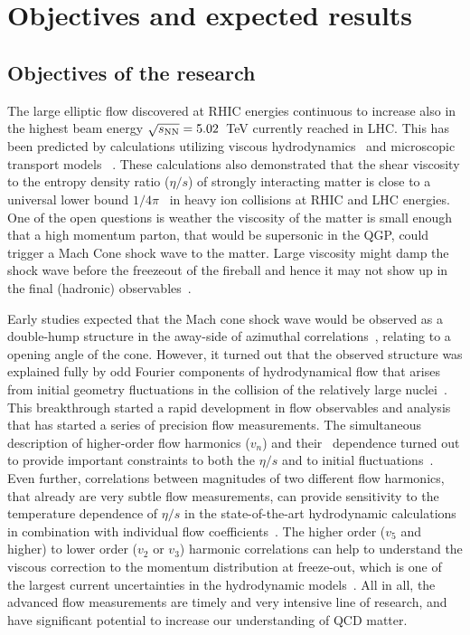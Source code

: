 \section{Objectives and expected results} %
\label{sec:objectives}

\subsection{Objectives of the research}

The large elliptic flow discovered at RHIC energies continuous to increase also in the highest beam energy $\sqrt{s_{\rm NN}}=5.02$~TeV currently reached in LHC. This has been predicted by calculations utilizing viscous hydrodynamics~\cite{PhysRevLett.99.172301} and microscopic transport models ~\cite{PhysRevLett.101.082302}.  These calculations also demonstrated that the shear viscosity to the entropy density ratio ($\eta/s$) of strongly interacting matter is close to a universal lower bound $1/4\pi$~\cite{PhysRevLett.94.111601} in heavy ion collisions at RHIC and LHC energies. One of the open questions is weather the viscosity of the matter is small enough that a high momentum parton, that would be supersonic in the QGP, could trigger a Mach Cone shock wave to the matter. Large viscosity might damp the shock wave before the freezeout of the fireball and hence it may not show up in the final (hadronic) observables~\cite{Bouras:2010nt,Bouras:2012mh,PhysRevC.90.024904}.

Early studies expected that the Mach cone shock wave would be observed as a double-hump structure in the away-side of azimuthal correlations~\cite{jabref}, relating to a opening angle of the cone. However, it turned out that the observed structure was explained fully by odd Fourier components of hydrodynamical flow that arises from initial geometry fluctuations 
in the collision of the relatively large nuclei~\cite{Luzum:2012wu,ALICE:2011ab}. This breakthrough started a rapid development in flow observables and analysis that has started a series of precision flow measurements. The simultaneous description of higher-order flow harmonics ($v_{n}$) and their \pt{}\ dependence turned out to provide important constraints to both the $\eta/s$ and to initial fluctuations~\cite{Luzum:2012wu}. Even further, correlations between magnitudes of two different flow harmonics, that already are very subtle flow measurements, can provide sensitivity to the temperature dependence of $\eta/s$ in the state-of-the-art hydrodynamic calculations~\cite{Niemi:2015qia} in combination with individual flow coefficients~\cite{ALICE:2016kpq}. The higher order ($v_5$ and higher) to lower order ($v_2$ or $v_3$) harmonic correlations can help to understand the viscous correction to the momentum distribution at freeze-out, which is one of the largest current uncertainties in the hydrodynamic models~\cite{PhysRevC.86.044908,Niemi:2015qia}. All in all, the advanced flow measurements are timely and very intensive line of research, and have significant potential to increase our understanding of QCD matter.


